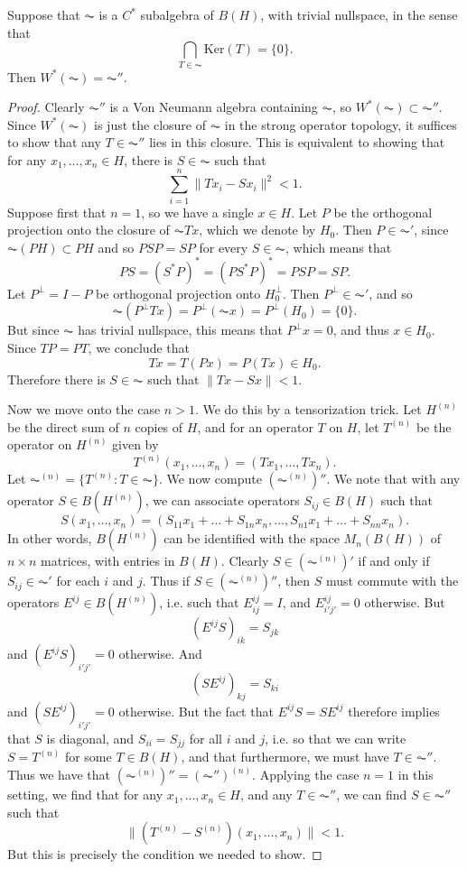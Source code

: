 \begin{theorem}
    Suppose that $\AC$ is a $C^*$ subalgebra of $B(H)$, with trivial nullspace, in the sense that
    \[ \bigcap_{T \in \AC} \text{Ker}(T) = \{ 0 \}. \]
    Then $W^*(\AC) = \AC''$.
\end{theorem}
\begin{proof}
    Clearly $\AC''$ is a Von Neumann algebra containing $\AC$, so $W^*(\AC) \subset \AC''$. Since $W^*(\AC)$ is just the closure of $\AC$ in the strong operator topology, it suffices to show that any $T \in \AC''$ lies in this closure. This is equivalent to showing that for any $x_1,\dots,x_n \in H$, there is $S \in \AC$ such that
    \[ \sum_{i = 1}^n \| Tx_i - Sx_i \|^2 < 1. \]
    Suppose first that $n = 1$, so we have a single $x \in H$. Let $P$ be the orthogonal projection onto the closure of $\AC Tx$, which we denote by $H_0$. Then $P \in \AC'$, since $\AC(PH) \subset PH$ and so $PSP = SP$ for every $S \in \AC$, which means that
    \[ PS = (S^* P)^* = (PS^*P)^* = PSP = SP. \]
    Let $P^\perp = I - P$ be orthogonal projection onto $H_0^\perp$. Then $P^\perp \in \AC'$, and so
    \[ \AC(P^\perp Tx) = P^\perp(\AC x) = P^\perp(H_0) = \{ 0 \}. \]
    But since $\AC$ has trivial nullspace, this means that $P^\perp x = 0$, and thus $x \in H_0$. Since $TP = PT$, we conclude that
    \[ Tx = T(Px) = P(Tx) \in H_0. \]
    Therefore there is $S \in \AC$ such that $\| Tx - Sx \| < 1$.

    Now we move onto the case $n > 1$. We do this by a tensorization trick. Let $H^{(n)}$ be the direct sum of $n$ copies of $H$, and for an operator $T$ on $H$, let $T^{(n)}$ be the operator on $H^{(n)}$ given by
    \[ T^{(n)}(x_1,\dots,x_n) = (Tx_1, \dots, Tx_n). \]
    Let $\AC^{(n)} = \{ T^{(n)} : T \in \AC \}$. We now compute $(\AC^{(n)})''$. We note that with any operator $S \in B(H^{(n)})$, we can associate operators $S_{ij} \in B(H)$ such that
    \[ S(x_1,\dots,x_n) = ( S_{11} x_1 + \dots + S_{1n} x_n , \dots, S_{n1} x_1 + \dots + S_{nn} x_n ). \]
    In other words, $B(H^{(n)})$ can be identified with the space $M_n(B(H))$ of $n \times n$ matrices, with entries in $B(H)$. Clearly $S \in (\AC^{(n)})'$ if and only if $S_{ij} \in \AC'$ for each $i$ and $j$. Thus if $S \in (\AC^{(n)})''$, then $S$ must commute with the operators $E^{ij} \in B(H^{(n)})$, i.e. such that $E^{ij}_{ij} = I$, and $E^{ij}_{i'j'} = 0$ otherwise. But
    \[ (E^{ij} S)_{ik} = S_{jk} \]
    and $(E^{ij} S)_{i'j'} = 0$ otherwise. And
    \[ (S E^{ij})_{kj} = S_{ki} \]
    and $(S E^{ij})_{i'j'} = 0$ otherwise. But the fact that $E^{ij} S = S E^{ij}$ therefore implies that $S$ is diagonal, and $S_{ii} = S_{jj}$ for all $i$ and $j$, i.e. so that we can write $S = T^{(n)}$ for some $T \in B(H)$, and that furthermore, we must have $T \in \AC''$. Thus we have that $(\AC^{(n)})'' = (\AC'')^{(n)}$. Applying the case $n = 1$ in this setting, we find that for any $x_1,\dots,x_n \in H$, and any $T \in \AC''$, we can find $S \in \AC''$ such that
    \[ \| (T^{(n)} - S^{(n)})(x_1,\dots,x_n) \| < 1. \]
    But this is precisely the condition we needed to show.
\end{proof}

